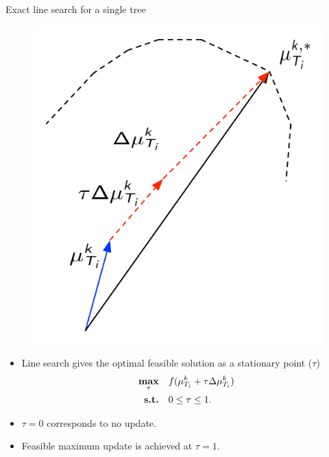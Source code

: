 \documentclass[first=dgreen,second=purple,logo=red]{aaltoslides}
\begin{document}
\iffalse
\begin{frame}{Exact line search for a single tree}
	\begin{figure}
		\begin{center}
			\includegraphics[scale=0.3]{optimization_single_tree.pdf}
		\end{center}
	\end{figure}
	\begin{itemize}
		\item Line search gives the optimal feasible solution as a stationary point ($\tau$)
		\begin{align}
			\underset{\tau}{\textbf{max}} &\quad f(\mathbf {\mu}_{T_i}^k + \tau\Delta\mathbf {\mu}_{T_i}^{k})\label{tree_line_search}\\
			\textbf{s.t.} &\quad 0\le\tau\le1.\nonumber
		\end{align}
		\item $\tau=0$ corresponds to no update.
		\item Feasible maximum update is achieved at $\tau=1$. 
	\end{itemize}
\end{frame}
\end{document}

